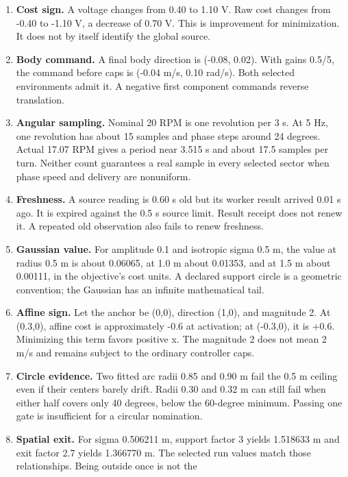 \documentclass[
  10pt,
  letterpaper,
]{article}
\providecommand{\tightlist}{%
  \setlength{\itemsep}{0pt}\setlength{\parskip}{0pt}}
\begin{document}
\begin{enumerate}
\def\labelenumi{\arabic{enumi}.}
\tightlist
\item
  \textbf{Cost sign.} A voltage changes from 0.40 to 1.10 V. Raw cost
  changes from -0.40 to -1.10 V, a decrease of 0.70 V. This is
  improvement for minimization. It does not by itself identify the
  global source.
\item
  \textbf{Body command.} A final body direction is (-0.08, 0.02). With
  gains 0.5/5, the command before caps is (-0.04 m/s, 0.10 rad/s). Both
  selected environments admit it. A negative first component commands
  reverse translation.
\item
  \textbf{Angular sampling.} Nominal 20 RPM is one revolution per 3 s.
  At 5 Hz, one revolution has about 15 samples and phase steps around 24
  degrees. Actual 17.07 RPM gives a period near 3.515 s and about 17.5
  samples per turn. Neither count guarantees a real sample in every
  selected sector when phase speed and delivery are nonuniform.
\item
  \textbf{Freshness.} A source reading is 0.60 s old but its worker
  result arrived 0.01 s ago. It is expired against the 0.5 s source
  limit. Result receipt does not renew it. A repeated old observation
  also fails to renew freshness.
\item
  \textbf{Gaussian value.} For amplitude 0.1 and isotropic sigma 0.5 m,
  the value at radius 0.5 m is about 0.06065, at 1.0 m about 0.01353,
  and at 1.5 m about 0.00111, in the objective's cost units. A declared
  support circle is a geometric convention; the Gaussian has an infinite
  mathematical tail.
\item
  \textbf{Affine sign.} Let the anchor be (0,0), direction (1,0), and
  magnitude 2. At (0.3,0), affine cost is approximately -0.6 at
  activation; at (-0.3,0), it is +0.6. Minimizing this term favors
  positive x. The magnitude 2 does not mean 2 m/s and remains subject to
  the ordinary controller caps.
\item
  \textbf{Circle evidence.} Two fitted arc radii 0.85 and 0.90 m fail
  the 0.5 m ceiling even if their centers barely drift. Radii 0.30 and
  0.32 m can still fail when either half covers only 40 degrees, below
  the 60-degree minimum. Passing one gate is insufficient for a circular
  nomination.
\item
  \textbf{Spatial exit.} For sigma 0.506211 m, support factor 3 yields
  1.518633 m and exit factor 2.7 yields 1.366770 m. The selected run
  values match those relationships. Being outside once is not the

\end{enumerate}
\end{document}

